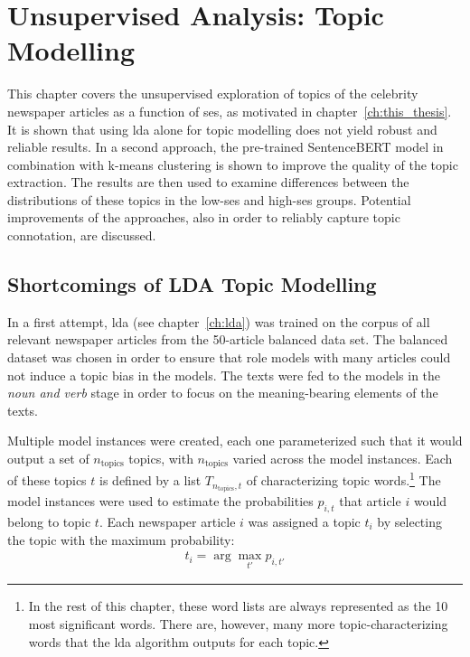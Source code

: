\renewcommand{\imagepath}{../50-unsupervised/img}
\newcommand{\ntopics}{n_\text{topics}}
\newcommand{\nclusters}{n_\text{clusters}}

\chapter{Unsupervised Analysis: Topic Modelling}\label{ch:unsupervised}
This chapter covers the unsupervised exploration of topics of the celebrity newspaper articles as a function of \gls{ses}, as motivated in chapter~\ref{ch:this_thesis}. It is shown that using \gls{lda} alone for topic modelling does not yield robust and reliable results. In a second approach, the pre-trained SentenceBERT model in combination with k-means clustering is shown to improve the quality of the topic extraction. The results are then used to examine differences between the distributions of these topics in the low-\gls{ses} and high-\gls{ses} groups. Potential improvements of the approaches, also in order to reliably capture topic connotation, are discussed.

\section{Shortcomings of LDA Topic Modelling}\label{ch:lda_topic_modelling}
In a first attempt, \gls{lda} (see chapter~\ref{ch:lda}) was trained on the corpus of all relevant newspaper articles from the 50-article balanced data set. The balanced dataset was chosen in order to ensure that role models with many articles could not induce a topic bias in the models. The texts were fed to the models in the \textit{noun and verb} stage in order to focus on the meaning-bearing elements of the texts.

Multiple model instances were created, each one parameterized such that it would output a set of $\ntopics$ topics, with $\ntopics$ varied across the model instances. Each of these topics $t$ is defined by a list $T_{\ntopics, t}$ of characterizing topic words.\footnote{In the rest of this chapter, these word lists are always represented as the 10 most significant words. There are, however, many more topic-characterizing words that the \gls{lda} algorithm outputs for each topic.} The model instances were used to estimate the probabilities $p_{i, t}$ that article $i$ would belong to topic $t$. Each newspaper article $i$ was assigned a topic $t_i$ by selecting the topic with the maximum probability:
\begin{align}
    t_i = \arg \max_{t'} p_{i, t'}
\end{align}

